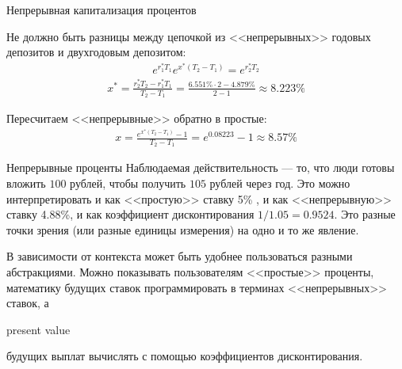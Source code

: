 \documentclass{beamer}
\newcommand{\en}[1]{\begin{otherlanguage}{english}#1\end{otherlanguage}}
\begin{document}
\begin{frame}{Непрерывная капитализация процентов}
\centering
{}

\justifying
Не должно быть разницы между цепочкой из <<непрерывных>> годовых депозитов и двухгодовым депозитом:
\begin{align*}
e^{r_1^*T_1}e^{x^*(T_2-T_1)} = e^{r_2^*T_2}
\end{align*}
\begin{align*}
x^* = \frac{r_2^*T_2-r_1^*T_1}{T_2-T_1} = \frac{6.551\%\cdot2 - 4.879\%}{2 - 1} \approx 8.223\%
\end{align*}

Пересчитаем <<непрерывные>> обратно в простые:
\begin{align*}
x = \frac{e^{x^*(T_2-T_1)} - 1}{T_2 - T_1} = e^{0.08223} - 1 \approx 8.57\% 
\end{align*}
\end{frame}



\begin{frame}{Непрерывные проценты}
\justify
Наблюдаемая действительность --- то, что люди готовы вложить $100$ рублей, чтобы получить $105$ рублей через год. Это можно интерпретировать и как <<простую>> ставку 5\% , и как <<непрерывную>> ставку 4.88\%, и как коэффициент дисконтирования $1/1.05 = 0.9524$. Это разные точки зрения (или разные единицы измерения) на одно и то же явление.

\justify 
В зависимости от контекста может быть удобнее пользоваться разными абстракциями. Можно показывать пользователям <<простые>> проценты, математику будущих ставок программировать в терминах <<непрерывных>> ставок, а \en{present value} будущих выплат вычислять с помощью коэффициентов дисконтирования.
\end{frame}
\end{document}
